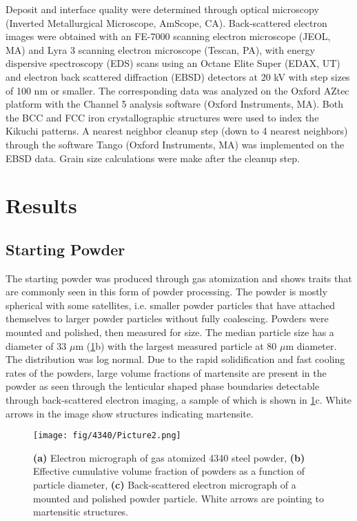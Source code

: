 Deposit and interface quality were determined through optical microscopy (Inverted Metallurgical Microscope, AmScope, CA). Back-scattered electron images were obtained with an FE-7000 scanning electron microscope (JEOL, MA) and Lyra 3 scanning electron microscope (Tescan, PA), with energy dispersive spectroscopy (EDS) scans using an Octane Elite Super (EDAX, UT) and electron back scattered diffraction (EBSD) detectors at 20 kV with step sizes of 100 nm or smaller. The corresponding data was analyzed on the Oxford AZtec platform with the Channel 5 analysis software (Oxford Instruments, MA). Both the BCC and FCC iron crystallographic structures were used to index the Kikuchi patterns. A nearest neighbor cleanup step (down to 4 nearest neighbors) through the software Tango (Oxford Instruments, MA) was implemented on the EBSD data. Grain size calculations were make after the cleanup step.

\section*{Results}


\subsection*{Starting Powder}


The starting powder was produced through gas atomization and shows traits that are commonly seen in this form of powder processing. The powder is mostly spherical with some satellites, i.e. smaller powder particles that have attached themselves to larger powder particles without fully coalescing. Powders were mounted and polished, then measured for size. The median particle size has a diameter of 33 $ \mu $m (\ref{fig:43402}b) with the largest measured particle at 80 $ \mu $m diameter. The distribution was log normal. Due to the rapid solidification and fast cooling rates of the powders, large volume fractions of martensite are present in the powder as seen through the lenticular shaped phase boundaries detectable through back-scattered electron imaging, a sample of which is shown in \ref{fig:43402}c. White arrows in the image show structures indicating martensite.

\begin{figure}
	\centering
	\texttt{[image: fig/4340/Picture2.png]}
	\caption[Gas atomized 4340 steel powder.]{\textbf{(a)} Electron micrograph of gas atomized 4340 steel powder, \textbf{(b)} Effective cumulative volume fraction of powders as a function of particle diameter, \textbf{(c)} Back-scattered electron micrograph of a mounted and polished powder particle. White arrows are pointing to martensitic structures.}
	\label{fig:43402}
\end{figure}


